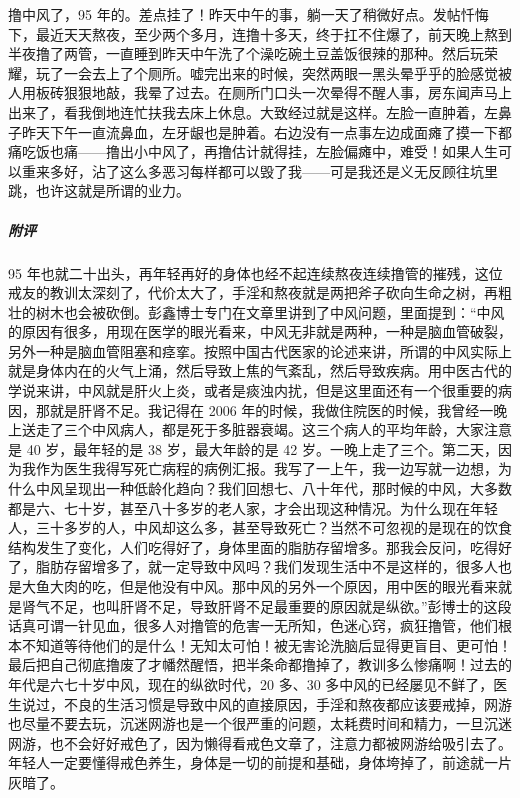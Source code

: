 \begin{case}
    撸中风了，95 年的。差点挂了！昨天中午的事，躺一天了稍微好点。发帖忏悔下，最近天天熬夜，至少两个多月，连撸十多天，终于扛不住爆了，前天晚上熬到半夜撸了两管，一直睡到昨天中午洗了个澡吃碗土豆盖饭很辣的那种。然后玩荣耀，玩了一会去上了个厕所。嘘完出来的时候，突然两眼一黑头晕乎乎的脸感觉被人用板砖狠狠地敲，我晕了过去。在厕所门口头一次晕得不醒人事，房东闻声马上出来了，看我倒地连忙扶我去床上休息。大致经过就是这样。左脸一直肿着，左鼻子昨天下午一直流鼻血，左牙龈也是肿着。右边没有一点事左边成面瘫了摸一下都痛吃饭也痛——撸出小中风了，再撸估计就得挂，左脸偏瘫中，难受！如果人生可以重来多好，沾了这么多恶习每样都可以毁了我——可是我还是义无反顾往坑里跳，也许这就是所谓的业力。
    \subparagraph{附评} 95 年也就二十出头，再年轻再好的身体也经不起连续熬夜连续撸管的摧残，这位戒友的教训太深刻了，代价太大了，手淫和熬夜就是两把斧子砍向生命之树，再粗壮的树木也会被砍倒。彭鑫博士专门在文章里讲到了中风问题，里面提到：“中风的原因有很多，用现在医学的眼光看来，中风无非就是两种，一种是脑血管破裂，另外一种是脑血管阻塞和痉挛。按照中国古代医家的论述来讲，所谓的中风实际上就是身体内在的火气上涌，然后导致上焦的气紊乱，然后导致疾病。用中医古代的学说来讲，中风就是肝火上炎，或者是痰浊内扰，但是这里面还有一个很重要的病因，那就是肝肾不足。我记得在 2006 年的时候，我做住院医的时候，我曾经一晚上送走了三个中风病人，都是死于多脏器衰竭。这三个病人的平均年龄，大家注意是 40 岁，最年轻的是 38 岁，最大年龄的是 42 岁。一晚上走了三个。第二天，因为我作为医生我得写死亡病程的病例汇报。我写了一上午，我一边写就一边想，为什么中风呈现出一种低龄化趋向？我们回想七、八十年代，那时候的中风，大多数都是六、七十岁，甚至八十多岁的老人家，才会出现这种情况。为什么现在年轻人，三十多岁的人，中风却这么多，甚至导致死亡？当然不可忽视的是现在的饮食结构发生了变化，人们吃得好了，身体里面的脂肪存留增多。那我会反问，吃得好了，脂肪存留增多了，就一定导致中风吗？我们发现生活中不是这样的，很多人也是大鱼大肉的吃，但是他没有中风。那中风的另外一个原因，用中医的眼光看来就是肾气不足，也叫肝肾不足，导致肝肾不足最重要的原因就是纵欲。”彭博士的这段话真可谓一针见血，很多人对撸管的危害一无所知，色迷心窍，疯狂撸管，他们根本不知道等待他们的是什么！无知太可怕！被无害论洗脑后显得更盲目、更可怕！最后把自己彻底撸废了才幡然醒悟，把半条命都撸掉了，教训多么惨痛啊！过去的年代是六七十岁中风，现在的纵欲时代，20 多、30 多中风的已经屡见不鲜了，医生说过，不良的生活习惯是导致中风的直接原因，手淫和熬夜都应该要戒掉，网游也尽量不要去玩，沉迷网游也是一个很严重的问题，太耗费时间和精力，一旦沉迷网游，也不会好好戒色了，因为懒得看戒色文章了，注意力都被网游给吸引去了。年轻人一定要懂得戒色养生，身体是一切的前提和基础，身体垮掉了，前途就一片灰暗了。
\end{case}


